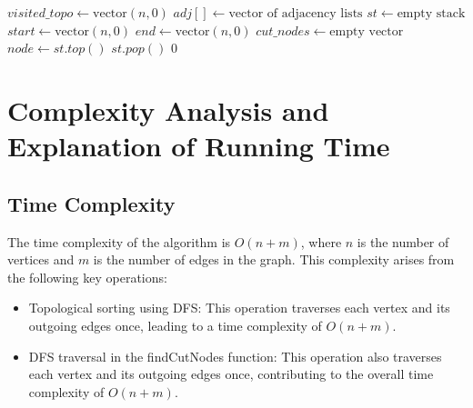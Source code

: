 \documentclass{article}
\begin{document}
\begin{algorithm}
\begin{algorithmic}[1]
            \State $visited\_topo \gets \text{vector}(n, 0)$ 
            \State $adj[] \gets \text{vector of adjacency lists}$ 
            \State $st \gets \text{empty stack}$ 
             
                 
                    \State {} 
                \EndIf
            \EndFor
            \State $start \gets \text{vector}(n, 0)$ 
            \State $end \gets \text{vector}(n, 0)$ 
            \State $cut\_nodes \gets \text{empty vector}$ 
             
                \State $node \gets st.top()$ 
                \State $st.pop()$ 
                 
                    \State {} 
                \EndIf
            \EndWhile
            \State \Return $0$ 
        \EndFunction
        
        \end{algorithmic}
    \end{algorithm}


\section{Complexity Analysis and Explanation of Running Time}
    \subsection{Time Complexity}
        The time complexity of the algorithm is $O(n + m)$, where $n$ is the number of vertices and $m$ is the number of edges in the graph. This complexity arises from the following key operations:
        \begin{itemize}
            \item Topological sorting using DFS: This operation traverses each vertex and its outgoing edges once, leading to a time complexity of $O(n + m)$.
            \item DFS traversal in the findCutNodes function: This operation also traverses each vertex and its outgoing edges once, contributing to the overall time complexity of $O(n + m)$.
        \end{itemize}
\end{document}
